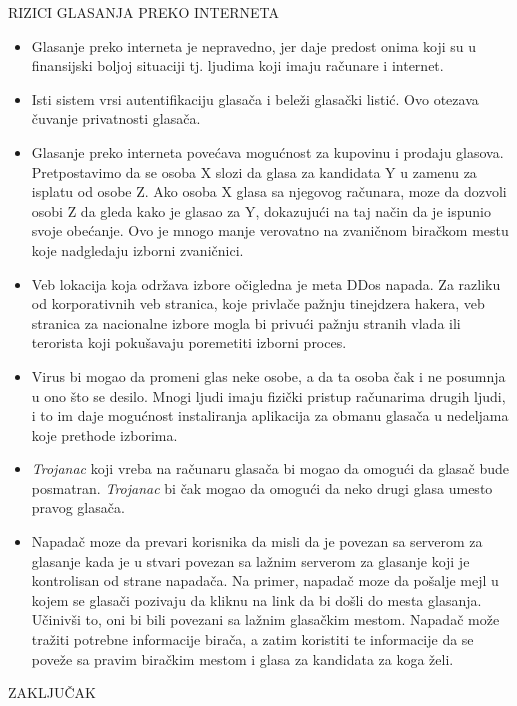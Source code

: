 \documentclass[a4paper]{article}
\theoremstyle{break}
\begin{document}
{\noindent RIZICI GLASANJA PREKO INTERNETA
\begin{itemize}
\item Glasanje preko interneta je nepravedno, jer daje predost onima koji su u finansijski boljoj situaciji tj. ljudima koji imaju računare i internet.
\item Isti sistem vrsi autentifikaciju glasača i beleži glasački listić. Ovo otezava čuvanje privatnosti glasača.
\item Glasanje preko interneta povećava mogućnost za kupovinu i prodaju glasova. Pretpostavimo da se osoba X slozi da glasa za kandidata Y u zamenu za isplatu od osobe Z. Ako osoba X glasa sa njegovog računara, moze da dozvoli osobi Z da gleda kako je glasao za Y, dokazujući na taj način da je ispunio svoje obećanje. Ovo je mnogo manje verovatno na zvaničnom biračkom mestu koje nadgledaju izborni zvaničnici.
\item Veb lokacija koja održava izbore očigledna je meta DDos napada. Za razliku od korporativnih veb stranica, koje privlače pažnju tinejdzera hakera, veb stranica za nacionalne izbore mogla bi privući pažnju stranih vlada ili terorista koji pokušavaju poremetiti izborni proces.
\item Virus bi mogao da promeni glas neke osobe, a da ta osoba čak i ne posumnja u ono što se desilo. Mnogi ljudi imaju fizički pristup računarima drugih ljudi, i to im daje mogućnost instaliranja aplikacija za obmanu glasača u nedeljama koje prethode izborima.
\item \textit{Trojanac} koji vreba na računaru glasača bi mogao da omogući da glasač bude posmatran. \textit{Trojanac} bi čak mogao da omogući da neko drugi glasa umesto pravog glasača.
\item Napadač moze da prevari korisnika da misli da je povezan sa serverom za glasanje kada je u stvari povezan sa lažnim serverom za glasanje koji je kontrolisan od strane napadača. Na primer, napadač moze da pošalje mejl u kojem se glasači pozivaju da kliknu na link da bi došli do mesta glasanja. Učinivši to, oni bi bili povezani sa lažnim glasačkim mestom. Napadač može tražiti potrebne informacije birača, a zatim koristiti te informacije da se poveže sa pravim biračkim mestom i glasa za kandidata za koga želi.
\end{itemize}

\noindent ZAKLJUČAK

}
\end{document}
